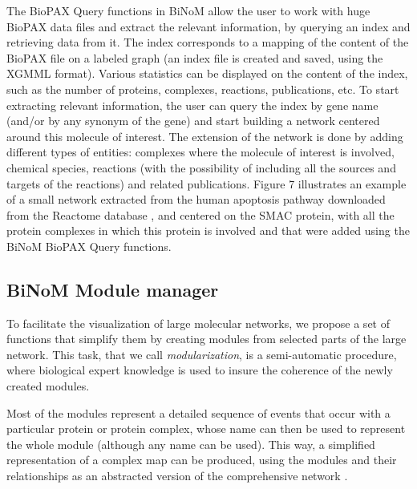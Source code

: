 \documentclass[10pt]{bmc_article}
\newenvironment{bmcformat}{\baselineskip20pt\sloppy\setboolean{publ}{false}}{\baselineskip20pt\sloppy}
\begin{document}
\begin{bmcformat}
The BioPAX Query functions in BiNoM allow the user to work with huge
BioPAX data files and extract the relevant information, by querying an index and
retrieving data from it. The index corresponds to a mapping of the content of
the BioPAX file on a labeled graph (an index file is created and saved, using
the XGMML format). Various statistics can be displayed on the content of the
index, such as the number of proteins, complexes, reactions, publications, etc.
To start extracting relevant information, the user can query the index by gene
name (and/or by any synonym of the gene) and start building a network centered
around this molecule of interest. The extension of the network is done by adding
different types of entities: complexes where the molecule of interest is
involved, chemical species, reactions (with the possibility of including all the
sources and targets of the reactions) and related publications. Figure 7
illustrates an example of a small network extracted from the human apoptosis
pathway downloaded from the Reactome database \cite{joshi2005reactome}, and
centered on the SMAC protein, with all the protein complexes in which
this protein is involved and that were added using the BiNoM BioPAX Query functions.


\subsection*{BiNoM Module manager}

To facilitate the visualization of large molecular networks, we propose a set of
functions that simplify them by creating modules from selected parts of the
large network. This task, that we call \emph{modularization}, is a
semi-automatic procedure, where biological expert knowledge is used to insure
the coherence of the newly created modules.

Most of the modules represent a detailed
sequence of events that occur with a particular protein or protein complex,
whose name can then be used to represent the whole module (although any name can be used). This way, a
simplified representation of a complex map can be produced, using the modules
and their relationships as an abstracted version of the comprehensive network
\cite{calzone2008comprehensive}.


\end{bmcformat}
\end{document}
